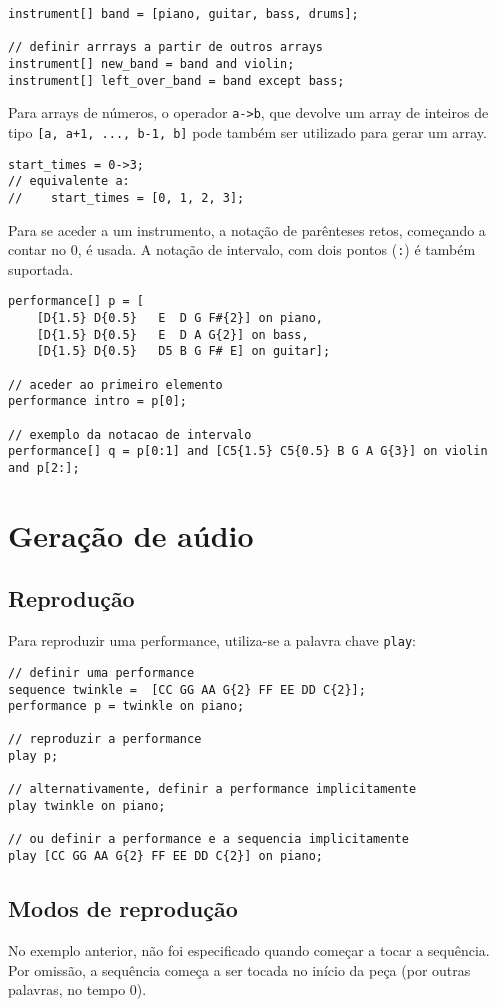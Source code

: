 \documentclass{article}
\begin{document}
\begin{lstlisting} 
instrument[] band = [piano, guitar, bass, drums];

// definir arrrays a partir de outros arrays
instrument[] new_band = band and violin;
instrument[] left_over_band = band except bass;
\end{lstlisting} 

Para arrays de números, o operador \texttt{a->b}, que devolve um array de inteiros de tipo \texttt{[a, a+1, ..., b-1, b]} pode também ser utilizado para gerar um array.
\begin{lstlisting}
start_times = 0->3;
// equivalente a:
//    start_times = [0, 1, 2, 3];
\end{lstlisting}

Para se aceder a um instrumento, a notação de parênteses retos, começando a contar no 0, é usada. A notação de intervalo, com dois pontos (\texttt{:}) é também suportada.
\begin{lstlisting} 
performance[] p = [
    [D{1.5} D{0.5}   E  D G F#{2}] on piano, 
    [D{1.5} D{0.5}   E  D A G{2}] on bass,
    [D{1.5} D{0.5}   D5 B G F# E] on guitar];
    
// aceder ao primeiro elemento
performance intro = p[0];

// exemplo da notacao de intervalo
performance[] q = p[0:1] and [C5{1.5} C5{0.5} B G A G{3}] on violin and p[2:];
\end{lstlisting}


\section{Geração de aúdio} \label{audio}
\subsection{Reprodução}
Para reproduzir uma performance, utiliza-se a palavra chave \texttt{play}:
\begin{lstlisting} 
// definir uma performance
sequence twinkle =  [CC GG AA G{2} FF EE DD C{2}];
performance p = twinkle on piano;

// reproduzir a performance
play p;

// alternativamente, definir a performance implicitamente
play twinkle on piano;

// ou definir a performance e a sequencia implicitamente
play [CC GG AA G{2} FF EE DD C{2}] on piano;
\end{lstlisting} 
\subsection{Modos de reprodução}
No exemplo anterior, não foi especificado quando começar a tocar a sequência. Por omissão, a sequência começa a ser tocada no início da peça (por outras palavras, no tempo 0).
\end{document}
